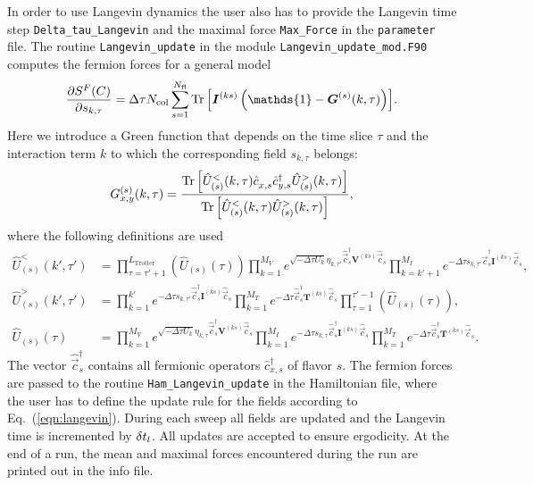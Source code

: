In order to use Langevin dynamics the user also has to provide the Langevin time step \texttt{Delta\_tau\_Langevin} and the maximal force \texttt{Max\_Force} in the \texttt{parameter} file. The routine  \texttt{Langevin\_update} in the module \texttt{Langevin\_update\_mod.F90}   computes the fermion forces  for a  general model
\begin{equation}
 \frac { \partial S^F(C)}{\partial s_{k,\tau} } 
 	= \Delta \tau {N_{\mathrm{col}}} \sum\limits_{s=1}^{N_{\mathrm{fl}}} \Tr{\left[ \bm{I}^{(ks)}\left(\mathds{1} - \bm{G}^{(s)}(k,\tau) \right) \right]} .
\end{equation}
Here we introduce a Green function that depends on the time slice $\tau$  and the interaction term $k$ to which the corresponding field $s_{k,\tau}$ belongs:
\begin{equation}\label{eqn:green_langevin}
G_{x,y}^{(s)}(k,\tau) = \frac{\Tr{\left[ \hat{U}_{(s)}^{<}(k,\tau) \hat{c}_{x,s}^{\phantom\dagger} \hat{c}_{y,s}^{\dagger} \hat{U}_{(s)}^{>}(k,\tau) \right]} }
{\Tr{\left[ \hat{U}_{(s)}^{<}(k,\tau)\hat{U}_{(s)}^{>}(k,\tau) \right]}},
\end{equation}
where the following definitions are used
\begin{align}
 \hat{U}_{(s)}^{<}(k',\tau') &= \prod_{\tau=\tau'+1}^{L_{\text{Trotter}}}  \left( \hat{U}_{(s)}(\tau) \right)
  \prod_{k=1}^{M_V} e^{\sqrt{-\Delta\tau U_k}  \eta_{k,\tau'} \hat{\vec{c}}_{s}^{\dagger} \bm{V}^{(ks)} \hat{\vec{c}}_{s}^{\phantom\dagger}}
\prod_{k=k'+1}^{M_I} e^{-\Delta\tau s_{k,\tau'} \hat{\vec{c}}_{s}^{\dagger} \bm{I}^{(ks)} \hat{\vec{c}}_{s}^{\phantom\dagger}}, \\
 \hat{U}_{(s)}^{>}(k',\tau') &= \prod_{k=1}^{k'} e^{-\Delta \tau s_{k,\tau'}  \hat{\vec{c}}_{s}^{\dagger} \bm{I}^{(ks)} \hat{\vec{c}}_{s}^{\phantom\dagger}}
  \prod_{k=1}^{M_T}   e^{-\Delta\tau  \hat{\vec{c}}_{s}^{\dagger} \bm{T}^{(ks)} \hat{\vec{c}}_{s}^{\phantom\dagger}} 
  \prod_{\tau=1}^{\tau'-1}  \left( \hat{U}_{(s)}(\tau) \right), \\
  \hat{U}_{(s)}(\tau) &= \prod_{k=1}^{M_V} e^{\sqrt{-\Delta\tau U_k}  \eta_{k,\tau} \hat{\vec{c}}_{s}^{\dagger} \bm{V}^{(ks)} \hat{\vec{c}}_{s}^{\phantom\dagger}} 
  \prod_{k=1}^{M_I} e^{-\Delta\tau s_{k,\tau} \hat{\vec{c}}_{s}^{\dagger} \bm{I}^{(ks)} \hat{\vec{c}}_{s}^{\phantom\dagger}}
    \prod_{k=1}^{M_T}   e^{-\Delta\tau  \hat{\vec{c}}_{s}^{\dagger} \bm{T}^{(ks)} \hat{\vec{c}}_{s}^{\phantom\dagger}} .
\end{align}
The vector $\hat{\vec{c}}_s^{\dagger}$ contains all fermionic operators $\hat{c}_{x,s}^{\dagger}$ of flavor $s$.
The fermion forces are passed to the routine \texttt{Ham\_Langevin\_update} in the Hamiltonian file, where the user has to define the update rule for the fields according to Eq.~(\ref{eqn:langevin}). During each sweep all fields are updated and the Langevin time is incremented by $\delta t_{l}$. All updates are accepted to ensure ergodicity. At the end of a run, the mean and maximal forces encountered during the run are printed out in the info file.

